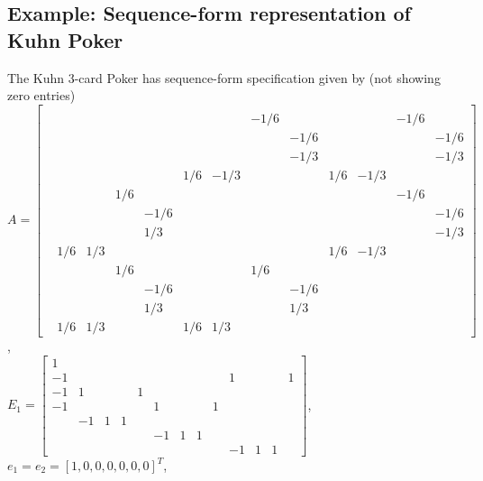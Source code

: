 \documentclass{article} %
\begin{document}
\subsection{Example: Sequence-form representation of Kuhn Poker}
\label{sec:kuhn_sf}
The Kuhn 3-card Poker \cite{kuhn} has sequence-form specification given by (not showing zero entries)\\
$A = \left[\begin{array}{ccccccccccccc}
  &   &   &   &   &   &   &   &   &   &   &   &  \\
  &   &   &   &   &   &   & -1 / 6 &   &   &   & -1 / 6 &  \\
  &   &   &   &   &   &   &   & -1 / 6 &   &   &   & -1 / 6\\
  &   &   &   &   &   &   &   & -1 / 3 &   &   &   & -1 / 3\\
  &   &   &   &   & 1 / 6 & -1 / 3 &   &   & 1 / 6 & -1 / 3 &   &  \\
  &   &   & 1 / 6 &   &   &   &   &   &   &   & -1 / 6 &  \\
  &   &   &   & -1 / 6 &   &   &   &   &   &   &   & -1 / 6\\
  &   &   &   & 1 / 3 &   &   &   &   &   &   &   & -1 / 3\\
  & 1 / 6 & 1 / 3 &   &   &   &   &   &   & 1 / 6 & -1 / 3 &   &  \\
  &   &   & 1 / 6 &   &   &   & 1 / 6 &   &   &   &   &  \\
  &   &   &   & -1 / 6 &   &   &   & -1 / 6 &   &   &   &  \\
  &   &   &   & 1 / 3 &   &   &   & 1 / 3 &   &   &   &  \\
  & 1 / 6 & 1 / 3 &   &   & 1 / 6 & 1 / 3 &   &   &   &   &   &  
\end{array}\right]$,\\
$E_1 = \left[\begin{array}{ccccccccccccc}
1 &   &   &   &   &   &   &   &   &   &   &   &  \\
-1 &   &   &   &   &   &   &   &   & 1 &   &   & 1\\
-1 & 1 &   &   & 1 &   &   &   &   &   &   &   &  \\
-1 &   &   &   &   & 1 &   &   & 1 &   &   &   &  \\
  & -1 & 1 & 1 &   &   &   &   &   &   &   &   &  \\
  &   &   &   &   & -1 & 1 & 1 &   &   &   &   &  \\
  &   &   &   &   &   &   &   &   & -1 & 1 & 1 &  
\end{array}\right]$, $e_1 = e_2 = [1, 0, 0, 0, 0, 0, 0]^T$,\\
\end{document}

